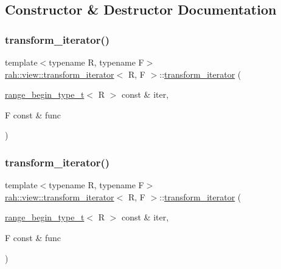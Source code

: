 \subsection{Constructor \& Destructor Documentation}
\mbox{\label{structrah_1_1view_1_1transform__iterator_ae8f127be961b14896c87d94e710a9a1a}} 
\subsubsection{\texorpdfstring{transform\_iterator()}{transform\_iterator()}\hspace{0.1cm}{\footnotesize\ttfamily [1/2]}}
{\footnotesize\ttfamily template$<$typename R, typename F$>$ \\
\mbox{\hyperlink{structrah_1_1view_1_1transform__iterator}{rah\+::view\+::transform\+\_\+iterator}}$<$ R, F $>$\+::\mbox{\hyperlink{structrah_1_1view_1_1transform__iterator}{transform\+\_\+iterator}} (\begin{DoxyParamCaption}\item[{\mbox{\hyperlink{namespacerah_a28aff4eeddcece6be65ff0b956d32d4a}{range\+\_\+begin\+\_\+type\+\_\+t}}$<$ R $>$ const \&}]{iter,  }\item[{F const \&}]{func }\end{DoxyParamCaption})\hspace{0.3cm}{\ttfamily [inline]}}

\mbox{\label{structrah_1_1view_1_1transform__iterator_ae8f127be961b14896c87d94e710a9a1a}} 
\subsubsection{\texorpdfstring{transform\_iterator()}{transform\_iterator()}\hspace{0.1cm}{\footnotesize\ttfamily [2/2]}}
{\footnotesize\ttfamily template$<$typename R, typename F$>$ \\
\mbox{\hyperlink{structrah_1_1view_1_1transform__iterator}{rah\+::view\+::transform\+\_\+iterator}}$<$ R, F $>$\+::\mbox{\hyperlink{structrah_1_1view_1_1transform__iterator}{transform\+\_\+iterator}} (\begin{DoxyParamCaption}\item[{\mbox{\hyperlink{namespacerah_a28aff4eeddcece6be65ff0b956d32d4a}{range\+\_\+begin\+\_\+type\+\_\+t}}$<$ R $>$ const \&}]{iter,  }\item[{F const \&}]{func }\end{DoxyParamCaption})\hspace{0.3cm}{\ttfamily [inline]}}



